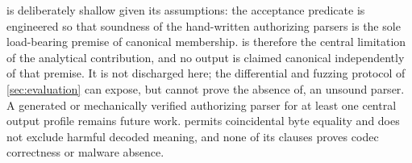  is deliberately shallow given its assumptions:
the acceptance predicate is engineered so that soundness of the hand-written
authorizing parsers is the sole load-bearing premise of canonical membership.
 is therefore the central limitation of the
analytical contribution, and no output is claimed canonical independently of
that premise. It is not discharged here; the differential and fuzzing protocol
of \cref{sec:evaluation} can expose, but cannot prove the absence of, an
unsound parser. A generated or mechanically verified authorizing parser for at
least one central output profile remains future work.  permits coincidental byte
equality and does not exclude harmful decoded meaning, and none of its clauses
proves codec correctness or malware absence.
